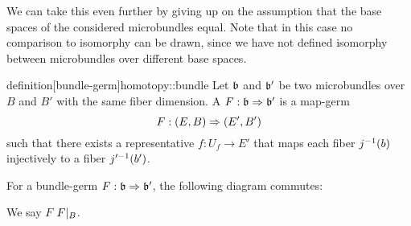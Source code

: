 \begin{myparagraph}
    We can take this even further by giving up on the assumption that the base spaces of the considered microbundles equal.
    Note that in this case no comparison to isomorphy can be drawn,
    since we have not defined isomorphy between microbundles over different base spaces.
\end{myparagraph}

\begin{mystatement}{definition}[bundle-germ]{homotopy::bundle}
    Let $\bb$ and $\bb'$ be two microbundles over $B$ and $B'$ with the same fiber dimension.
    A  $\germdef{F}{\bb}{\bb'}$ is a map-germ
    \[ F: (E, B) \Rightarrow{} (E', B') \]
    such that there exists a representative $f: U_f \to E'$ that maps each fiber $j^{-1}(b)$ injectively to a fiber $j'^{-1}(b')$.
\end{mystatement}

\begin{myparagraph}
    For a bundle-germ $\germdef{F}{\bb}{\bb'}$, the following diagram commutes:
    \begin{center}
    \end{center}
    We say $F$  $F\vert_{B}$.
\end{myparagraph}